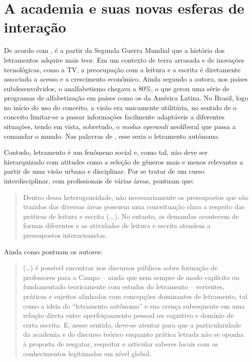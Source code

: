 \documentclass{textolivre}
\begin{document}
\section{A academia e suas novas esferas de interação}\label{sec-academia}
De acordo com \textcite{takaki_letramentos_2008}, é a partir da Segunda Guerra Mundial que a história dos letramentos adquire mais teor. Em um contexto de terra arrasada e de inovações tecnológicas, como a TV, a preocupação com a leitura e a escrita é diretamente associada a acesso e a crescimento econômico. Ainda segundo a autora, nos países subdesenvolvidos, o analfabetismo chegava a 80\%, o que gerou uma série de programas de alfabetização em países como os da América Latina. No Brasil, logo no início do uso do conceito, a visão era unicamente utilitária, no sentido de o conceito limitar-se a passar informações facilmente adaptáveis a diferentes situações, tendo em vista, sobretudo, o \textit{modus operandi} neoliberal que passa a comandar o mundo. Nas palavras de \textcite{street_letramentos_2014}, esse seria o letramento autônomo.

Contudo, letramento é um fenômeno social e, como tal, não deve ser hierarquizado com atitudes como a seleção de gêneros mais e menos relevantes a partir de uma visão urbana e disciplinar. Por se tratar de um curso interdisciplinar, com profissionais de várias áreas, \textcite[p. 67]{magnani_da_2018} pontuam que:

\begin{quote}
    Dentro dessa heterogeneidade, não necessariamente os pressupostos que são trazidos das diversas áreas possuem uma conceituação clara a respeito das práticas de leitura e escrita (...). No entanto, as demandas acontecem de formas diferentes e as atividades de leitura e escrita atendem a pressupostos interacionistas.
\end{quote}

Ainda como pontuam os autores:

\begin{quote}
    (\ldots) é possível encontrar nos discursos públicos sobre formação de professores para o Campo -- ainda que nem sempre de modo explícito ou fundamentado teoricamente com estudos do letramento -- vertentes, práticas e sujeitos alinhados com concepções dominantes de letramento, tal como a ideia do “letramento autônomo” \cite{street_letramentos_2014} e sua crença subsequente em uma relação direta entre aperfeiçoamento pessoal ou cognitivo e domínio de certa escrita. E, nesse sentido, deve-se atentar para que a particularidade da academia e do discurso teórico enquanto prática letrada não se oponha à proposta de resgatar, respeitar e articular saberes locais com os conhecimentos legitimados em nível global. \cite[p. 68]{magnani_da_2018}
\end{quote}
\end{document}
